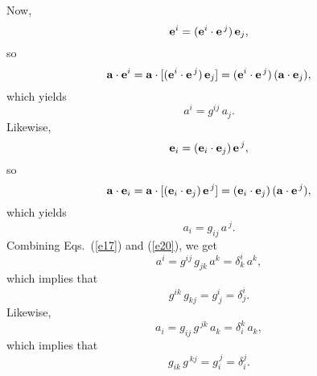 \documentclass[12pt,prb,aps,notitlepage]{revtex4-1}
\begin{document}
 Now, 
 \begin{equation}
 {\bf e}^i = ({\bf e}^i\cdot{\bf e}^{\,j})\,{\bf e}_j,
 \end{equation}
so
\begin{equation}
{\bf a}\cdot{\bf e}^i = {\bf a}\cdot[ ({\bf e}^i\cdot{\bf e}^{\,j})\,{\bf e}_j]=( {\bf e}^i\cdot{\bf e}^{\,j})\,({\bf a}\cdot{\bf e}_j),
\end{equation}
which yields
\begin{equation}\label{e17}
a^i = g^{ij}\,a_j.
\end{equation}
Likewise, 
\begin{equation}
 {\bf e}_i = ({\bf e}_i\cdot{\bf e}_j)\,{\bf e}^{\,j},
 \end{equation}
so 
\begin{equation}
{\bf a}\cdot{\bf e}_i = {\bf a}\cdot[ ({\bf e}_i\cdot{\bf e}_j)\,{\bf e}^{\,j}]= ({\bf e}_i\cdot{\bf e}_j)\,({\bf a}\cdot{\bf e}^{\,j}),
\end{equation}
which yields
\begin{equation}\label{e20}
a_i = g_{ij}\,a^{\,j}.
\end{equation}
Combining Eqs.~(\ref{e17}) and (\ref{e20}), we get
\begin{equation}
a^i = g^{ij}\,g_{jk}\,a^k = \delta^{i}_k\,a^k,
\end{equation}
which implies that
\begin{equation}
g^{ik}\,g_{kj}= g^i_{\,j}=\delta^{i}_j.
\end{equation}
Likewise, 
\begin{equation}
a_i = g_{ij}\,g^{\,jk}\,a_k = \delta_{i}^k\,a_k,
\end{equation}
which implies that
\begin{equation}
g_{ik}\,g^{\,kj}= g_i^{\,j}=\delta_{i}^j.
\end{equation}
\end{document}
